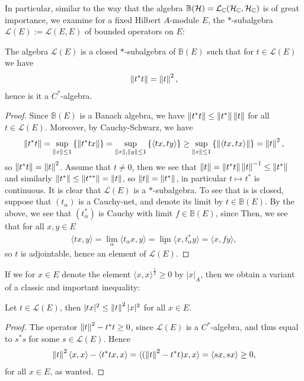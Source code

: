 In particular, similar to the way that the algebra $\mathbb{B}(\mathcal{H}) = \mathcal{L}_{\mathbb{C}}(\mathcal{H}_{\mathbb{C}},\mathcal{H}_{\mathbb{C}})$ is of great importance, we examine for a fixed Hilbert $A$-module $E$, the $*$-subalgebra $\mathcal{L}(E):=\mathcal{L}(E,E)$ of bounded operators on $E$:
\begin{proposition}
	The algebra $\mathcal{L}(E)$ is a closed $*$-subalgebra of $\mathbb{B}(E)$ such that for $t \in \mathcal{L}(E)$ we have
	\begin{align*}
		\left\lVert t^*t\right\rVert = \left\lVert t \right\rVert^2,
	\end{align*}
	hence is it a $C^*$-algebra.
\end{proposition}
\begin{proof}
	Since $\mathbb{B}(E)$ is a Banach algebra, we have $\left\lVert t^*t\right\rVert \leq \left\lVert t^*\right\rVert \left\lVert t\right\rVert$ for all $t \in \mathcal{L}(E)$. Moreover, by Cauchy-Schwarz, we have
	\begin{align*}
		\left\lVert t^* t \right\rVert = \sup_{\left\lVert x \right\rVert \leq 1} \left\{ \left\lVert t^*tx\right\rVert \right\} = \sup_{\left\lVert x\right\rVert, \left\lVert y \right\rVert \leq 1} \left\{ \langle tx,ty\rangle \right\}\geq \sup_{\left\lVert x \right\rVert \leq 1} \left\{ \left\lVert \langle tx, tx \rangle \right\rVert \right\} = \left\lVert t \right\rVert^2,
	\end{align*}
	so $\left\lVert t^*t\right\rVert = \left\lVert t\right\rVert^2$. Assume that $t \neq 0$, then we see that $\left\lVert t \right\rVert = \left\lVert t^* t\right\rVert \left\lVert t \right\rVert ^{-1} \leq \left\lVert t^*\right\rVert$ and similarly $\left\lVert t^*\right\rVert \leq \left\lVert t^{**}\right\rVert=\left\lVert t \right\rVert$, so $\left\lVert t \right\rVert = \left\lVert t^*\right\rVert$, in particular $t \mapsto t^*$ is continuous. It is clear that $\mathcal{L}(E)$ is a $*$-subalgebra. To see that is is closed, suppose that $(t_\alpha)$ is a Cauchy-net, and denote its limit by $t \in \mathbb{B}(E)$. By the above, we see that $(t_\alpha^*)$ is Cauchy with limit $f \in \mathbb{B}(E)$, since  Then, we see that for all $x,y \in E$ 
	\begin{align*}
		\langle t x,y\rangle = \lim_{\alpha}\langle t_\alpha x , y \rangle = \lim_{_\alpha}\langle x, t_\alpha^* y \rangle = \langle x,fy\rangle,
	\end{align*}
	so $t$ is adjointable, hence an element of $\mathcal{L}(E)$.
\end{proof}
If we for $x \in E$ denote the element $\langle x, x \rangle^{\frac12}\geq 0$ by $|x|_A$, then we obtain a variant of a classic and important inequality:
\begin{lemma}
	Let $t \in \mathcal{L}(E)$, then $|tx|^2 \leq \left\lVert t \right\rVert^2 |x|^2$ for all $x \in E$.
\end{lemma}
\begin{proof}
	The operator $\left\lVert t \right\rVert ^2-t^*t\geq 0$, since $\mathcal{L}(E)$ is a $C^*$-algebra, and thus equal to $s^*s$ for some $s \in \mathcal{L}(E)$. Hence
	\begin{align*}
	\left\lVert t \right\rVert^2 \langle x, x \rangle - \langle t^*t x,x\rangle =\langle (\left\lVert t \right\rVert^2 - t^*t)x,x\rangle=	\langle sx , sx \rangle  \geq 0,
	\end{align*}
	for all $x \in E$, as wanted.
\end{proof}
